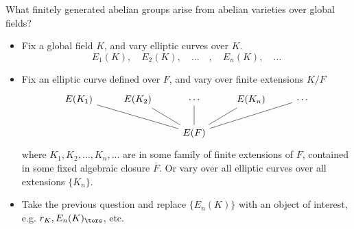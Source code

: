 \begin{frame}
\begin{ques}
What finitely generated abelian groups arise from abelian varieties over global fields?
\end{ques}
\end{frame}



\begin{frame}
\end{frame}



\begin{frame}
\begin{itemize}
\item Fix a global field $K$, and vary elliptic curves over $K$.
	\[
	E_1(K), \quad E_2(K), \quad \ldots \quad , \quad E_n(K), \quad \ldots
	\]  \pause

\item Fix an elliptic curve defined over $F$, and vary over finite extensions $K/F$
	\[
	\begin{tikzcd}[ampersand replacement=\&]
	E(K_1) \& E(K_2) \& \cdots \& E(K_n) \& \cdots \\
	\& \& E(F) \arrow[dash]{ull} \arrow[dash]{ul} \arrow[dash]{u} \arrow[dash]{ur} \arrow[dash]{urr} \& \& 
	\end{tikzcd}
	\]
where $K_1,K_2,\ldots,K_n,\ldots$ are in some family of finite extensions of $F$, contained in some fixed algebraic closure $\overline{F}$. Or vary over all elliptic curves over all extensions $\{K_n\}$. \pspace \pause

\item Take the previous question and replace $\{E_n(K)\}$ with an object of interest, e.g. $r_K, E_n(K)_\tors$, etc. 
\end{itemize}
\end{frame}



\begin{frame}
\end{frame}



